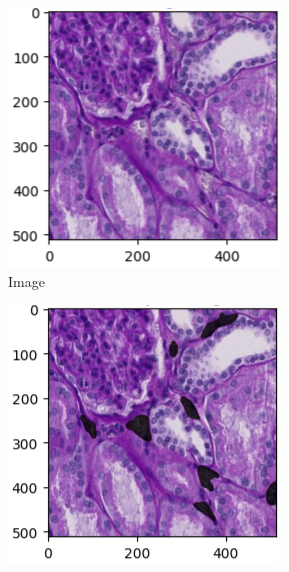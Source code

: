 \begin{figure}[H]
	\centering
	\begin{subfigure}[b]{0.3\textwidth}
		\centering
		\includegraphics[width=\textwidth]{gambar/image.png}
		\caption{Image}
		\label{fig:image}
	\end{subfigure}
	\hfill
	\begin{subfigure}[b]{0.3\textwidth}
		\centering
		\includegraphics[width=\textwidth]{gambar/overlayed_image.png}

\end{subfigure}
\end{figure}
